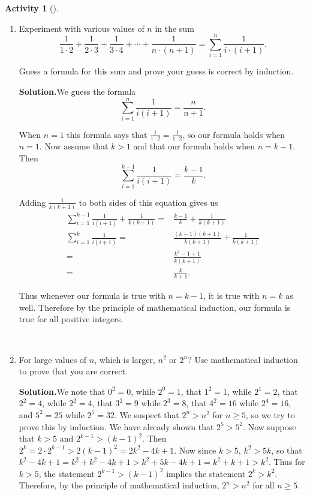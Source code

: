 \documentclass[10pt,]{book}
\theoremstyle{plain}
\theoremstyle{definition}
\newtheorem{activity}[project]{Activity}
\numberwithin{equation}{chapter}
\newcommand{\amp}{&}
\begin{document}
\begin{activity}[]
\begin{enumerate}[label=(\alph*)]
~\par
\item Experiment with various values of \(n\) in the sum%
\begin{equation*}
\frac{1}{1\cdot2}+\frac{1}{2\cdot3} + \frac{1}{3\cdot
4}+\cdots+\frac{1}{n\cdot (n+1)} = \sum_{i=1}^n \frac{1}{i\cdot(i+1)}.
\end{equation*}
%
\par
Guess a formula for this sum and prove your guess is correct by induction.%
\par\medskip\noindent%
\textbf{Solution.}\quad We guess the formula%
\begin{equation*}
\sum_{i=1}^n\frac{1}{i(i+1)} = \frac{n}{n+1}.
\end{equation*}
%
\par
When \(n=1\) this formula says that \(\frac{1}{1\cdot2}=\frac{1}{1\cdot
2}\), so our formula holds when \(n=1\). Now assume that \(k>1\) and that our formula holds when \(n=k-1\). Then%
\begin{equation*}
\sum_{i=1}^{k-1} \frac{1}{i(i+1)}= \frac{k-1}{k}.
\end{equation*}
%
\par
Adding \(\frac{1}{k(k+1)}\) to both sides of this equation gives us%
\begin{align*}
\sum_{i=1}^{k-1} \frac{1}{i(i+1)}+\frac{1}{k(k+1)}  =\amp  \frac{k-1}{k}+\frac{1}{k(k+1)}\\
\sum_{i=1}^k \frac{1}{i(i+1)} =\amp \frac{(k-1)(k+1)}{k(k+1)}+\frac{1}{k(k+1)}\\
=\amp \frac{k^2 -1 +1}{k(k+1)}\\
=\amp  \frac{k}{k+1}.
\end{align*}
%
\par
Thus whenever our formula is true with \(n=k-1\), it is true with \(n=k\) as well. Therefore by the principle of mathematical induction, our formula is true for all positive integers.%

~\par
\item For large values of \(n\), which is larger, \(n^2\) or \(2^n\)? Use mathematical induction to prove that you are correct.%
\par\medskip\noindent%
\textbf{Solution.}\quad We note that \(0^2=0\), while \(2^0=1\), that \(1^2=1\), while \(2^1=2\), that \(2^2=4\), while \(2^2=4\), that \(3^2=9\) while \(2^3=8\), that \(4^2=16\) while \(2^4=16\), and \(5^2=25\) while \(2^5=32\). We suspect that \(2^n>n^2\) for \(n\ge 5\), so we try to prove this by induction. We have already shown that \(2^5>5^2\). Now suppose that \(k>5\) and \(2^{k-1}>(k-1)^2\). Then \(2^k=2\cdot2^{k-1}>2(k-1)^2=2k^2-4k +1\). Now since \(k>5\), \(k^2>5k\), so that \(k^2-4k+1=k^2+k^2-4k+1>k^2+5k-4k+1=k^2+k+1>k^2\). Thus for \(k>5\), the statement \(2^{k-1}>(k-1)^2\) implies the statement \(2^k>k^2\). Therefore, by the principle of mathematical induction, \(2^n>n^2\) for all \(n\ge 5\).%


\end{enumerate}
\end{activity}
\end{document}
